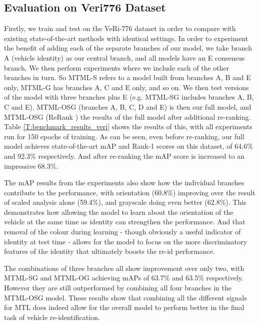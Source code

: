 \documentclass[10pt,twocolumn,letterpaper]{article}
\begin{document}
\subsection{Evaluation on Veri776 Dataset}
Firstly, we train and test on the VeRi-776 dataset in order to compare with
existing state-of-the-art methods with identical settings. In order to experiment the benefit of adding each of the separate branches of our model, we take branch A (vehicle identity) as our central branch, and all models have an E consensus branch. We then perform experiments where we include each of the other branches in turn. So MTML-S refers to a model built from branches A, B and E only, MTML-G has branches A, C and E only, and so on. We then test versions of the model with three branches plus E (e.g. MTML-SG includes branches A, B, C and E).
MTML-OSG (branches A, B, C, D and E) is then our full model, and MTML-OSG (ReRank \cite{zhong2017re}) the results of the full model after additional re-ranking. Table \ref{T:benchmark_results_veri} shows the results of this, with all experiments run for 150 epochs of training. As can be seen,
even before re-ranking, our full model achieves state-of-the-art mAP
and Rank-1 scores on this dataset, of 64.6\% and 92.3\%
respectively. And after re-ranking the mAP score is increased to an
impressive 68.3\%.

The mAP results from the experiments also show how the individual branches contribute to the performance, with orientation (60.8\%) improving over the result of scaled analysis alone (59.4\%), and grayscale doing even better (62.8\%). This demonstrates how allowing the model to learn about the orientation of the vehicle at the same time as identity can strengthen the performance. And that removal of the colour during learning - though obviously a useful indicator of identity at test time - allows for the model to focus on the more discriminatory features of the identity that ultimately boosts the re-id performance.

The combinations of three branches all show improvement over only two, with MTML-SG and MTML-OG achieving mAPs of 63.7\% and 63.5\% respectively. However they are still outperformed by combining all four branches in the MTML-OSG model. These results show that combining all the different signals for MTL does indeed allow for the overall model to perform better in the final task of vehicle re-identification.


\end{document}

